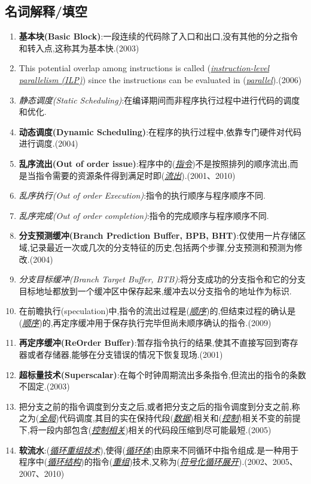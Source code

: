 \documentclass[a4paper]{ctexart}
\newcommand{\blank}[1]{(\emph{\underline{#1}})}
\begin{document}
\subsection{名词解释/填空}
\begin{enumerate}
  \item \textbf{基本块(Basic Block)}:一段连续的代码除了入口和出口,没有其他的分之指令和转入点,这称其为基本快.(2003)
  \item This potential overlap among instructions is called (\emph{\underline{instruction-level parallelism (ILP)}}) since the instructions can be evaluated in (\emph{\underline{parallel}}).(2006)
  \item \emph{静态调度(Static Scheduling)}:在编译期间而非程序执行过程中进行代码的调度和优化.
  \item \textbf{动态调度(Dynamic Scheduling)}:在程序的执行过程中,依靠专门硬件对代码进行调度.(2004)
  \item \textbf{乱序流出(Out of order issue)}:程序中的\blank{指令}不是按照排列的顺序流出,而是当指令需要的资源条件得到满足时即\blank{流出}.(2001、2010)
  \item \emph{乱序执行(Out of order Execution)}:指令的执行顺序与程序顺序不同.
  \item \emph{乱序完成(Out of order completion)}:指令的完成顺序与程序顺序不同.
  \item \textbf{分支预测缓冲(Branch Prediction Buffer, BPB, BHT)}:仅使用一片存储区域,记录最近一次或几次的分支特征的历史,包括两个步骤,分支预测和预测为修改.(2004)
  \item \emph{分支目标缓冲(Branch Target Buffer, BTB)}:将分支成功的分支指令和它的分支目标地址都放到一个缓冲区中保存起来,缓冲去以分支指令的地址作为标识.
  \item 在前瞻执行(speculation)中,指令的流出过程是\blank{顺序}的,但结束过程的确认是\blank{顺序}的,再定序缓冲用于保存执行完毕但尚未顺序确认的指令.(2009)
  \item \textbf{再定序缓冲(ReOrder Buffer)}:暂存指令执行的结果,使其不直接写回到寄存器或者存储器,能够在分支错误的情况下恢复现场.(2001)
  \item \textbf{超标量技术(Superscalar)}:在每个时钟周期流出多条指令,但流出的指令的条数不固定.(2003)
  \item 把分支之前的指令调度到分支之后,或者把分支之后的指令调度到分支之前,称之为(\emph{\underline{全局}})代码调度,其目的实在保持代段\blank{数据}相关和\blank{控制}相关不变的前提下,将一段内部包含\blank{控制相关}相关的代码段压缩到尽可能最短.(2005)
  \item \textbf{软流水}:\blank{循环重组技术},使得\blank{循环体}由原来不同循环中指令组成.是一种用于程序中\blank{循环结构}的指令\blank{重组}技术,又称为\blank{符号化循环展开}.(2002、2005、2007、2010)
\end{enumerate}
\end{document}
